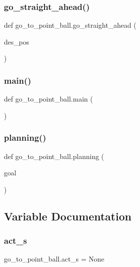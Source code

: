 \subsubsection{go\+\_\+straight\+\_\+ahead()}
{\footnotesize\ttfamily def go\+\_\+to\+\_\+point\+\_\+ball.\+go\+\_\+straight\+\_\+ahead (\begin{DoxyParamCaption}\item[{}]{des\+\_\+pos }\end{DoxyParamCaption})}

\mbox{\label{namespacego__to__point__ball_a4d4c016b6bb12c612710a2d39ade3465}} 
\subsubsection{main()}
{\footnotesize\ttfamily def go\+\_\+to\+\_\+point\+\_\+ball.\+main (\begin{DoxyParamCaption}{ }\end{DoxyParamCaption})}

\mbox{\label{namespacego__to__point__ball_ab0e05a6be4adc81f80b5635d9bd692d1}} 
\subsubsection{planning()}
{\footnotesize\ttfamily def go\+\_\+to\+\_\+point\+\_\+ball.\+planning (\begin{DoxyParamCaption}\item[{}]{goal }\end{DoxyParamCaption})}



\subsection{Variable Documentation}
\mbox{\label{namespacego__to__point__ball_a9ac8c67ea55b320e5eb2bdf665173ffa}} 
\subsubsection{act\+\_\+s}
{\footnotesize\ttfamily go\+\_\+to\+\_\+point\+\_\+ball.\+act\+\_\+s = None}

